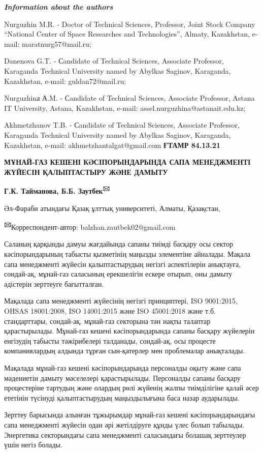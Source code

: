\emph{{\bfseries Information about the authors}}

Nurguzhin M.R. - Doctor of Technical Sciences, Professor, Joint Stock
Company ``National Center of Space Researches and Technologies'',
Almaty, Kazakhstan, e-mail: maratnurg57@mail.ru;

Danenova G.T. - Сandidate of Technical Sciences, Associate Professor,
Karaganda Technical University named by Abylkas Saginov, Karaganda,
Kazakhstan, e-mail: guldan72@mail.ru;

Nurguzhinа А.M. - Сandidate of Technical Sciences, Associate Professor,
Astana IT University, Astana, Kazakhstan, e-mail:
assel.nurguzhina@astanait.edu.kz;

Akhmetzhanov T.B. - Сandidate of Technical Sciences, Associate
Professor, Karaganda Technical University named by Abylkas Saginov,
Karaganda, Kazakhstan, e-mail: akhmetzhantalgat@gmail.com\newpage
{\bfseries ҒТАМР 84.13.21}

{\bfseries МҰНАЙ-ГАЗ КЕШЕНІ КӘСІПОРЫНДАРЫНДА САПА МЕНЕДЖМЕНТІ ЖҮЙЕСІН
ҚАЛЫПТАСТЫРУ ЖӘНЕ ДАМЫТУ}

{\bfseries Г.К. Тайманова, Б.Б. Заутбек\textsuperscript{🖂}}

Әл-Фараби атындағы Қазақ ұлттық университеті, Алматы, Қазақстан,

{\bfseries \textsuperscript{🖂}}Корреспондент-автор:
balzhan.zautbek02@gmail.com

Саланың қарқынды дамуы жағдайында сапаны тиімді басқару осы сектор
кәсіпорындарының табысты қызметінің маңызды элементіне айналады. Мақала
сапа менеджменті жүйесін қалыптастырудың негізгі аспектілерін анықтауға,
сондай-ақ, мұнай-газ саласының ерекшелігін ескере отырып, оны дамыту
әдістерін зерттеуге бағытталған.

Мақалада сапа менеджменті жүйесінің негізгі принциптері, ISO 9001:2015,
OHSAS 18001:2008, ISO 14001:2015 және ISO 45001:2018 және т.б.
стандарттары, сондай-ақ, мұнай-газ секторына тән нақты талаптар
қарастырылады. Мұнай-газ кешені кәсіпорындарында сапаны басқару
жүйелерін енгізудің табысты тәжірибелері талданады, сондай-ақ, осы
процесте компаниялардың алдында тұрған сын-қатерлер мен проблемалар
анықталады.

Мақалада мұнай-газ кешені кәсіпорындарында персоналды оқыту және сапа
мәдениетін дамыту мәселелері қарастырылады. Персоналды сапаны басқару
процестеріне тартудың және олардың рөлі жүйенің жалпы тиімділігіне қалай
әсер ететінін түсінуді қалыптастырудың маңыздылығына баса назар
аударылады.

Зерттеу барысында алынған тұжырымдар мұнай-газ кешені кәсіпорындарындағы
сапа менеджменті жүйесін одан әрі жетілдіруге құнды үлес болып табылады.
Энергетика секторындағы сапа менеджменті саласындағы болашақ зерттеулер
үшін негіз болады.

